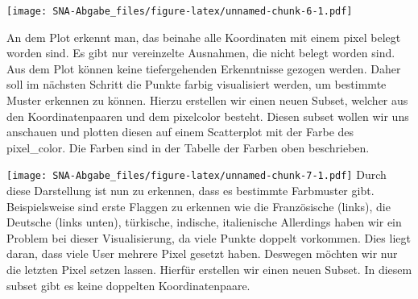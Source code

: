 \documentclass[
]{article}
\newenvironment{Shaded}{\begin{snugshade}}{\end{snugshade}}
\newcommand{\AttributeTok}[1]{\textcolor[rgb]{0.13,0.29,0.53}{#1}}
\newcommand{\CommentTok}[1]{\textcolor[rgb]{0.56,0.35,0.01}{\textit{#1}}}
\newcommand{\DecValTok}[1]{\textcolor[rgb]{0.00,0.00,0.81}{#1}}
\newcommand{\FunctionTok}[1]{\textcolor[rgb]{0.13,0.29,0.53}{\textbf{#1}}}
\newcommand{\NormalTok}[1]{#1}
\newcommand{\OtherTok}[1]{\textcolor[rgb]{0.56,0.35,0.01}{#1}}
\newcommand{\SpecialCharTok}[1]{\textcolor[rgb]{0.81,0.36,0.00}{\textbf{#1}}}
\newcommand{\StringTok}[1]{\textcolor[rgb]{0.31,0.60,0.02}{#1}}
\begin{document}
\texttt{[image: SNA-Abgabe\_files/figure-latex/unnamed-chunk-6-1.pdf]}

An dem Plot erkennt man, das beinahe alle Koordinaten mit einem pixel
belegt worden sind. Es gibt nur vereinzelte Ausnahmen, die nicht belegt
worden sind. Aus dem Plot können keine tiefergehenden Erkenntnisse
gezogen werden. Daher soll im nächsten Schritt die Punkte farbig
visualisiert werden, um bestimmte Muster erkennen zu können. Hierzu
erstellen wir einen neuen Subset, welcher aus den Koordinatenpaaren und
dem pixelcolor besteht. Diesen subset wollen wir uns anschauen und
plotten diesen auf einem Scatterplot mit der Farbe des pixel\_color. Die
Farben sind in der Tabelle der Farben oben beschrieben.

\begin{Shaded}
\end{Shaded}

\texttt{[image: SNA-Abgabe\_files/figure-latex/unnamed-chunk-7-1.pdf]}
Durch diese Darstellung ist nun zu erkennen, dass es bestimmte
Farbmuster gibt. Beispielsweise sind erste Flaggen zu erkennen wie die
Französische (links), die Deutsche (links unten), türkische, indische,
italienische Allerdings haben wir ein Problem bei dieser Visualisierung,
da viele Punkte doppelt vorkommen. Dies liegt daran, dass viele User
mehrere Pixel gesetzt haben. Deswegen möchten wir nur die letzten Pixel
setzen lassen. Hierfür erstellen wir einen neuen Subset. In diesem
subset gibt es keine doppelten Koordinatenpaare.
\end{document}
